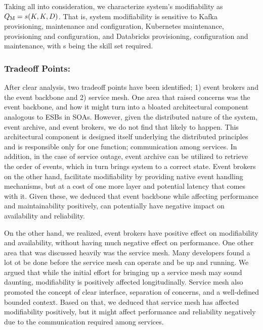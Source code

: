 \documentclass[runningheads]{llncs}
\begin{document}

Taking all into consideration, we characterize system's modifiability as $ Q\textsubscript{M} = s(K, K, D)$. That is, system modifiability is sensitive to Kafka provisioning, maintenance and configuration, Kubernetes maintenance, provisioning and configuration, and Databricks provisioning, configuration and maintenance, with s being the skill set required. 

\subsubsection{Tradeoff Points:}

After clear analysis, two tradeoff points have been identified; 1) event brokers and the event backbone and 2) service mesh. One area that raised concerns was the event backbone, and how it might turn into a bloated architectural component analogous to ESBs in SOAs. However, given the distributed nature of the system, event archive, and event brokers, we do not find that likely to happen. This architectural component is designed itself underlying the distributed principles and is responsible only for one function; communication among services. In addition, in the case of service outage, event archive can be utilized to retrieve the order of events, which in turn brings system to a correct state. Event brokers on the other hand, facilitate modifiability by providing native event handling mechanisms, but at a cost of one more layer and potential latency that comes with it. Given these, we deduced that event backbone while affecting performance and maintainability positively, can potentially have negative impact on availability and reliability. 
 
On the other hand, we realized, event brokers have positive effect on modifiability and availability, without having much negative effect on performance. One other area that was discussed heavily was the service mesh. Many developers found a lot ot be done before the service mesh can operate and be up and running. We argued that while the initial effort for bringing up a service mesh may sound daunting, modifiability is positively affected longitudinally. Service mesh also promoted the concept of clear interface, separation of concerns, and a well-defined bounded context. Based on that, we deduced that service mesh has affected modifiability positively, but it might affect performance and reliability negatively due to the communication required among services. 
\end{document}

